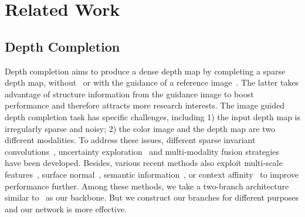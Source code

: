 \documentclass[letterpaper, 10 pt, conference]{ieeeconf}
\begin{document}
\section{Related Work}
\subsection{Depth Completion}
Depth completion aims to produce a dense depth map by completing a sparse depth map, without~\cite{Uhrig2017sparsity,Eldesokey2020uncertainty} or with the guidance of a reference image~\cite{Liu2013,Hua2018normalized,Cheng2018CSPN,Qiu2019deeplidar}. The latter takes advantage of structure information from the guidance image to boost performance and therefore attracts more research interests. The image guided depth completion task has specific challenges, including 1) the input depth map is irregularly sparse and noisy; 2) the color image and the depth map are two different modalities. To address these issues, different sparse invariant convolutions~\cite{Uhrig2017sparsity,Hua2018normalized,Eldesokey2018,Huang2019hms-net}, uncertainty exploration~\cite{Eldesokey2020uncertainty,Gansbeke2019} and multi-modality fusion strategies~\cite{Tang2019guided} have been developed. Besides, various recent methods also exploit multi-scale features~\cite{Eigen2014,Huang2019hms-net,Wang2018multiscale,Li2020MSG}, surface normal~\cite{Qiu2019deeplidar,Xu2019}, semantic information~\cite{Jaritz2018semantic,Schneider2016semantic}, or context affinity~\cite{Cheng2018CSPN,Cheng2020CSPN++,Park2020NLSPN} to improve performance further. Among these methods, we take a two-branch architecture similar to~\cite{Qiu2019deeplidar,Gansbeke2019} as our backbone. But we construct our branches for different purposes and our network is more effective. 
\end{document}
